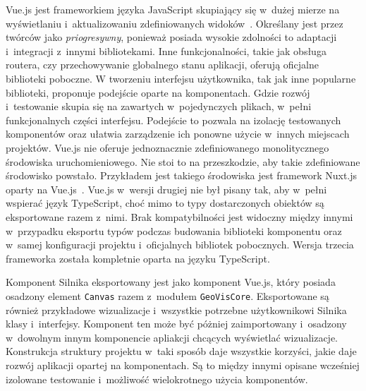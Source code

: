 Vue.js jest frameworkiem języka JavaScript skupiający się w~dużej mierze na wyświetlaniu i~aktualizowaniu zdefiniowanych widoków~\cite{Vue}. Określany jest przez twórców jako \textit{priogresywny}, ponieważ posiada wysokie zdolności to adaptacji i~integracji z~innymi bibliotekami. Inne funkcjonalności, takie jak obsługa routera, czy przechowywanie globalnego stanu aplikacji, oferują oficjalne biblioteki poboczne. W tworzeniu interfejsu użytkownika, tak jak inne popularne biblioteki, proponuje podejście oparte na komponentach. Gdzie rozwój i~testowanie skupia się na zawartych w~pojedynczych plikach, w~pełni funkcjonalnych części interfejsu. Podejście to pozwala na izolację testowanych komponentów oraz ułatwia zarządzenie ich ponowne użycie w~innych miejscach projektów. Vue.js nie oferuje jednoznacznie zdefiniowanego monolitycznego środowiska uruchomieniowego. Nie stoi to na przeszkodzie, aby takie zdefiniowane środowisko powstało. Przykładem jest takiego środowiska jest framework Nuxt.js oparty na Vue.js~\cite{Nuxt}. Vue.js w~wersji drugiej nie był pisany tak, aby w~pełni wspierać język TypeScript, choć mimo to typy dostarczonych obiektów są eksportowane razem z~nimi. Brak kompatybilności jest widoczny między innymi w~przypadku eksportu typów podczas budowania biblioteki komponentu oraz w~samej konfiguracji projektu i~oficjalnych bibliotek pobocznych. Wersja trzecia frameworka została kompletnie oparta na języku TypeScript. 

Komponent Silnika eksportowany jest jako komponent Vue.js, który posiada osadzony element \texttt{Canvas} razem z~modułem \texttt{GeoVisCore}. Eksportowane są również przykładowe wizualizacje i~wszystkie potrzebne użytkownikowi Silnika klasy i~interfejsy. Komponent ten może być póżniej zaimportowany i~osadzony w~dowolnym innym komponencie apliakcji chcących wyświetlać wizualizacje. Konstrukcja struktury projektu w~taki sposób daje wszystkie korzyści, jakie daje rozwój aplikacji opartej na komponentach. Są to między innymi opisane wcześniej izolowane testowanie i~możliwość wielokrotnego użycia komponentów. 

